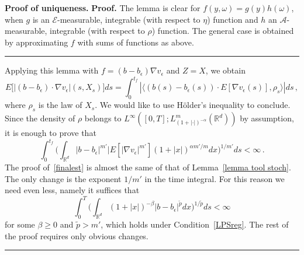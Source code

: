 \documentclass[a4paper,10pt]{article}
\newenvironment{proof}[1][Proof]{\noindent\textbf{#1.} }{\ \rule{0.5em}{0.5em}}
\newcommand{\mr}{\mathbb{R}}
\newcommand{\mc}{\mathcal}
\newcommand{\lan}{\langle}
\newcommand{\ran}{\rangle}
\newcommand{\td}{\tilde}
\newcommand{\eps}{\epsilon}
\begin{document}
\begin{proof}[Proof of uniqueness]
\begin{proof}
The lemma is clear for $f(y,\omega)=g(y)h(\omega)$, when $g$ is an $\mc{E}$-measurable, integrable (with respect to $\eta$) function and $h$ an $\mc{A}$-measurable, integrable (with respect to $\rho$) function. The general case is obtained by approximating $f$ with sums of functions as above.
\end{proof}

Applying this lemma with $f=(b-b_\eps)\nabla v_\eps$ and $Z=X$, we obtain
\begin{equation*}
E \big[ |(b-b_\eps)\cdot\nabla v_\eps|(s,X_s) \big] ds
 = \int^{t_f}_0|\lan(b(s)-b_\eps(s))\cdot E[\nabla v_\eps(s)],\rho_s\ran|ds \, ,
\end{equation*}
where $\rho_s$ is the law of $X_s$. We would like to use H\"older's inequality to conclude. Since the density of $\rho$ belongs to $L^\infty([0,T];L^m_{(1+|\cdot|)^{-\alpha}}(\mr^d))$ by assumption, it is enough to prove that
\begin{equation}
\int^{t_f}_0\Big(\int_{\mr^d}|b-b_\eps|^{m'}|E[|\nabla v_\eps|^{m'}](1+|x|)^{\alpha m'/m} dx\Big)^{1/m'}ds < \infty \,.\label{finalest}
\end{equation}
The proof of~\eqref{finalest} is almost the same of that of Lemma~\ref{lemma tool stoch}. The only change is the exponent $1/m'$ in the time integral. For this reason we need even less, namely it suffices that
\begin{equation*}
\int^T_0 \Big(\int_{\mr^d}(1+|x|)^{-\beta}|b-b_\eps|^{\td{p}}dx\Big)^{1/\td{p}}ds< \infty
\end{equation*}
for some $\beta\ge0$ and $\td{p}>m'$, which holds under Condition~\ref{LPSreg}. The rest of the proof requires only obvious changes.
\end{proof}
\end{document}
